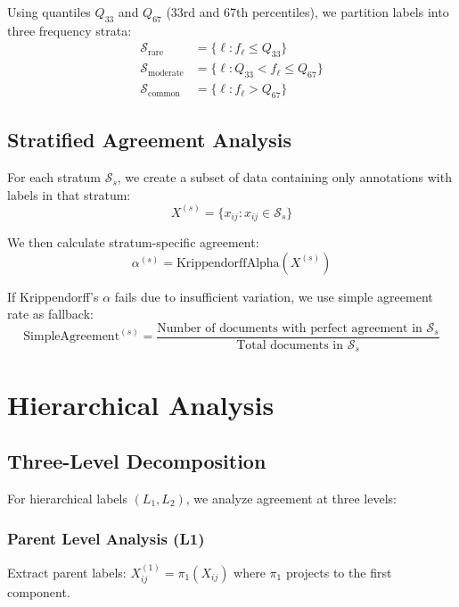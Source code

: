 \documentclass[11pt]{article}
\begin{document}
Using quantiles $Q_{33}$ and $Q_{67}$ (33rd and 67th percentiles), we partition labels into three frequency strata:
\begin{align}
\mathcal{S}_{\text{rare}} &= \{\ell : f_\ell \leq Q_{33}\} \\
\mathcal{S}_{\text{moderate}} &= \{\ell : Q_{33} < f_\ell \leq Q_{67}\} \\
\mathcal{S}_{\text{common}} &= \{\ell : f_\ell > Q_{67}\}
\end{align}

\subsection{Stratified Agreement Analysis}

For each stratum $\mathcal{S}_s$, we create a subset of data containing only annotations with labels in that stratum:
\begin{equation}
X^{(s)} = \{x_{ij} : x_{ij} \in \mathcal{S}_s\}
\end{equation}

We then calculate stratum-specific agreement:
\begin{equation}
\alpha^{(s)} = \text{KrippendorffAlpha}(X^{(s)})
\end{equation}

If Krippendorff's $\alpha$ fails due to insufficient variation, we use simple agreement rate as fallback:
\begin{equation}
\text{SimpleAgreement}^{(s)} = \frac{\text{Number of documents with perfect agreement in } \mathcal{S}_s}{\text{Total documents in } \mathcal{S}_s}
\end{equation}

\section{Hierarchical Analysis}

\subsection{Three-Level Decomposition}

For hierarchical labels $(L_1, L_2)$, we analyze agreement at three levels:

\subsubsection{Parent Level Analysis (L1)}
Extract parent labels: $X^{(1)}_{ij} = \pi_1(X_{ij})$ where $\pi_1$ projects to the first component.
\end{document}

